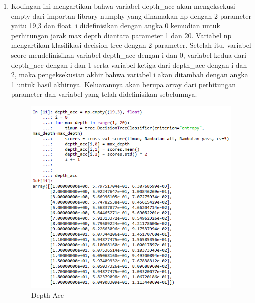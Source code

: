 \begin{enumerate}
\item Kodingan ini mengartikan bahwa variabel depth\_acc akan mengeksekusi empty dari importan library numphy yang dinamakan np dengan 2 parameter yaitu 19,3 dan float. i didefinisikan dengan angka 0 kemudian untuk perhitungan jarak max depth diantara parameter 1 dan 20. Variabel np mengartikan klasifikasi decision tree dengan 2 parameter. Setelah itu, variabel score mendefinisikan variabel depth\_acc dengan i dan 0, variabel kedua dari depth\_acc dengan i dan 1 serta variabel ketiga dari depth\_acc dengan i dan 2, maka pengeksekusian akhir bahwa variabel i akan ditambah dengan angka 1 untuk hasil akhirnya. Keluarannya akan berupa array dari perhitungan parameter dan variabel yang telah didefinisikan sebelumnya.
\begin{figure}[ht]
\centering
\includegraphics[scale=0.5]{figures/no11.png}
\caption{Depth Acc}
\label{Hasil}
\end{figure}
\end{enumerate}

